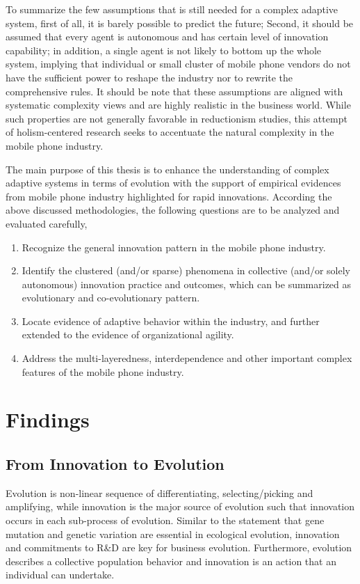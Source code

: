 \documentclass[utf8,english]{gradu3}
\begin{document}
To summarize the few assumptions that is still needed for a complex adaptive system, first of all, it is barely possible to predict the future; Second, it should be assumed that every agent is autonomous and has certain level of innovation capability; in addition, a single agent is not likely to bottom up the whole system, implying that individual or small cluster of mobile phone vendors do not have the sufficient power to reshape the industry nor to rewrite the comprehensive rules. It should be note that these assumptions are aligned with systematic complexity views and are highly realistic in the business world. While such properties are not generally favorable in reductionism studies, this attempt of holism-centered research seeks to accentuate the natural complexity in the mobile phone industry.

The main purpose of this thesis is to enhance the understanding of complex adaptive systems in terms of evolution with the support of empirical evidences from mobile phone industry highlighted for rapid innovations. According the above discussed methodologies, the following questions are to be analyzed and evaluated carefully,

\begin{enumerate}
    \item Recognize the general innovation pattern in the mobile phone industry.
    \item Identify the clustered (and/or sparse) phenomena in collective (and/or solely autonomous) innovation practice and outcomes, which can be summarized as evolutionary and co-evolutionary pattern.
    \item Locate evidence of adaptive behavior within the industry, and further extended to the evidence of organizational agility.
    \item Address the multi-layeredness, interdependence and other important complex features of the mobile phone industry.
\end{enumerate}

\chapter{Findings}

\section{From Innovation to Evolution}

Evolution is non-linear sequence of differentiating, selecting/picking and amplifying, while innovation is the major source of evolution such that innovation occurs in each sub-process of evolution. Similar to the statement that gene mutation and genetic variation are essential in ecological evolution, innovation and commitments to R\&D are key for business evolution. Furthermore, evolution describes a collective population behavior and innovation is an action that an individual can undertake.
\end{document}
